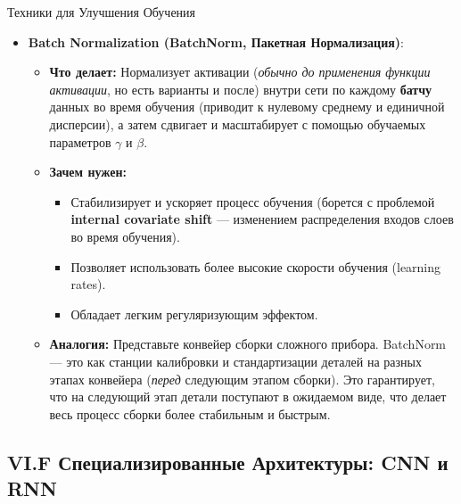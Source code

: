 \begin{myexampleblock}{Техники для Улучшения Обучения}
\begin{itemize}
        \item \textbf{Batch Normalization (BatchNorm, Пакетная Нормализация)}:
             \begin{itemize}
                 \item \textbf{Что делает:} Нормализует активации (\textit{обычно до применения функции активации}, но есть варианты и после) внутри сети по каждому \textbf{батчу} данных во время обучения (приводит к нулевому среднему и единичной дисперсии), а затем сдвигает и масштабирует с помощью обучаемых параметров $\gamma$ и $\beta$.
                 \item \textbf{Зачем нужен:}
                     \begin{itemize}
                         \item Стабилизирует и ускоряет процесс обучения (борется с проблемой \textbf{internal covariate shift} — изменением распределения входов слоев во время обучения).
                         \item Позволяет использовать более высокие скорости обучения (learning rates).
                         \item Обладает легким регуляризующим эффектом.
                     \end{itemize}
                 \item \textbf{Аналогия:} Представьте конвейер сборки сложного прибора. BatchNorm — это как станции калибровки и стандартизации деталей на разных этапах конвейера (\textit{перед} следующим этапом сборки). Это гарантирует, что на следующий этап детали поступают в ожидаемом виде, что делает весь процесс сборки более стабильным и быстрым.
             \end{itemize}
    \end{itemize}
\end{myexampleblock}

\subsection{VI.F Специализированные Архитектуры: CNN и RNN}


